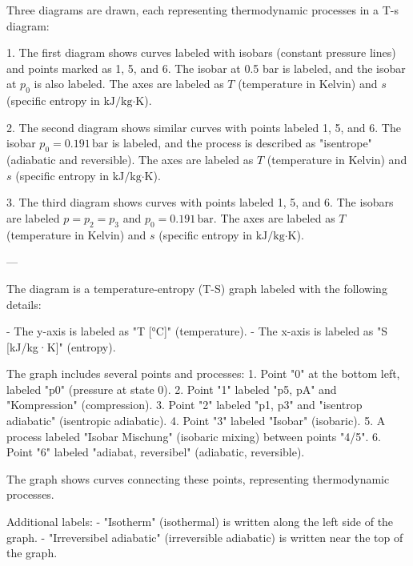 Three diagrams are drawn, each representing thermodynamic processes in a T-s diagram:  

1. The first diagram shows curves labeled with isobars (constant pressure lines) and points marked as 1, 5, and 6. The isobar at 0.5 bar is labeled, and the isobar at \( p_0 \) is also labeled. The axes are labeled as \( T \) (temperature in Kelvin) and \( s \) (specific entropy in \( \text{kJ/kg·K} \)).  

2. The second diagram shows similar curves with points labeled 1, 5, and 6. The isobar \( p_0 = 0.191 \, \text{bar} \) is labeled, and the process is described as "isentrope" (adiabatic and reversible). The axes are labeled as \( T \) (temperature in Kelvin) and \( s \) (specific entropy in \( \text{kJ/kg·K} \)).  

3. The third diagram shows curves with points labeled 1, 5, and 6. The isobars are labeled \( p = p_2 = p_3 \) and \( p_0 = 0.191 \, \text{bar} \). The axes are labeled as \( T \) (temperature in Kelvin) and \( s \) (specific entropy in \( \text{kJ/kg·K} \)).  

---

The diagram is a temperature-entropy (T-S) graph labeled with the following details:  

- The y-axis is labeled as "T [°C]" (temperature).  
- The x-axis is labeled as "S [kJ/kg·K]" (entropy).  

The graph includes several points and processes:  
1. Point "0" at the bottom left, labeled "p0" (pressure at state 0).  
2. Point "1" labeled "p5, pA" and "Kompression" (compression).  
3. Point "2" labeled "p1, p3" and "isentrop adiabatic" (isentropic adiabatic).  
4. Point "3" labeled "Isobar" (isobaric).  
5. A process labeled "Isobar Mischung" (isobaric mixing) between points "4/5".  
6. Point "6" labeled "adiabat, reversibel" (adiabatic, reversible).  

The graph shows curves connecting these points, representing thermodynamic processes.  

Additional labels:  
- "Isotherm" (isothermal) is written along the left side of the graph.  
- "Irreversibel adiabatic" (irreversible adiabatic) is written near the top of the graph.